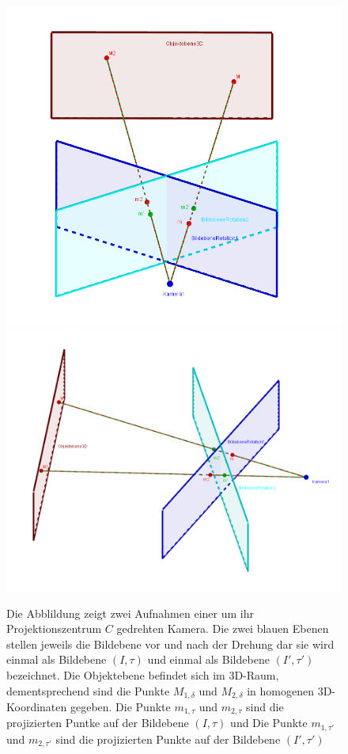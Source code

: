 \begin{figure}[!htb]
	\includegraphics[width=\linewidth]{images/Homographie_rotation_1.png}
	\label{fig:awesome_image1}
	\endminipage\hfill
	\includegraphics[width=\linewidth]{images/Homographie_rotation_2.png}
	\label{fig:awesome_image2}
	\endminipage\hfill
	\caption{Die Abblildung zeigt zwei Aufnahmen einer um ihr Projektionszentrum $C$ gedrehten Kamera. Die zwei blauen Ebenen stellen jeweils die Bildebene vor und nach der Drehung dar sie wird einmal als Bildebene $(I,\tau)$ und einmal als Bildebene $(I',\tau')$ bezeichnet. Die Objektebene befindet sich im 3D-Raum, dementsprechend sind die Punkte $M_{1,\delta}$ und $M_{2,\delta}$ in homogenen 3D-Koordinaten gegeben. Die Punkte $m_{1,\tau}$ und $m_{2,\tau}$ sind die projizierten Puntke auf der Bildebene $(I,\tau)$ und Die Punkte $m_{1,\tau'}$ und $m_{2,\tau'}$ sind die projizierten Punkte auf der Bildebene $(I',\tau')$}
	\label{fig:homographyRotatedProjectionCenter}
\end{figure}

